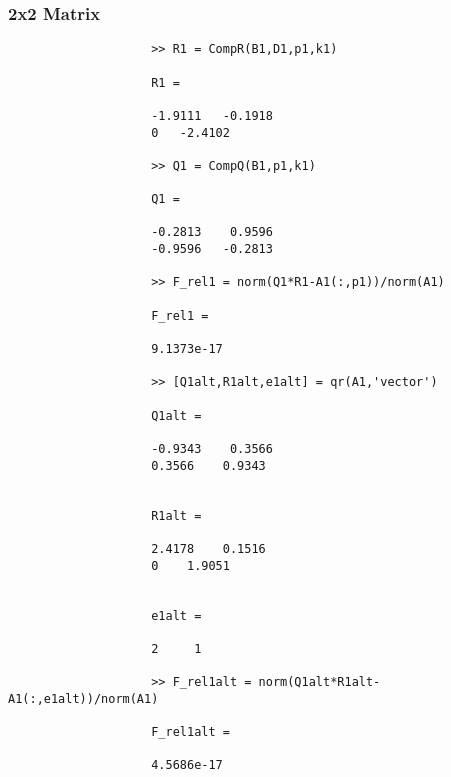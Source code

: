 \documentclass[11pt,titlepage]{article}
\begin{document}
			\subsubsection{2x2 Matrix}
				\begin{lstlisting}
					>> R1 = CompR(B1,D1,p1,k1)
					
					R1 =
					
					-1.9111   -0.1918
					0   -2.4102
					
					>> Q1 = CompQ(B1,p1,k1)
					
					Q1 =
					
					-0.2813    0.9596
					-0.9596   -0.2813
					
					>> F_rel1 = norm(Q1*R1-A1(:,p1))/norm(A1)
					
					F_rel1 =
					
					9.1373e-17
					
					>> [Q1alt,R1alt,e1alt] = qr(A1,'vector')
					
					Q1alt =
					
					-0.9343    0.3566
					0.3566    0.9343
					
					
					R1alt =
					
					2.4178    0.1516
					0    1.9051
					
					
					e1alt =
					
					2     1
					
					>> F_rel1alt = norm(Q1alt*R1alt-A1(:,e1alt))/norm(A1)
					
					F_rel1alt =
					
					4.5686e-17
				\end{lstlisting}
\end{document}
